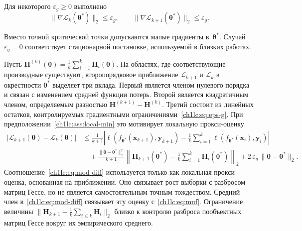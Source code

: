 \begin{assumption}\label{ch1lc:ass:local-min}
Для некоторого $\varepsilon_g\ge 0$ выполнено
\begin{equation}\label{ch1lc:eq:eps-g}
  \bigl\|\nabla \mathcal{L}_k(\boldsymbol{\theta}^*)\bigr\|_2 \le \varepsilon_g,
  \qquad
  \bigl\|\nabla \mathcal{L}_{k+1}(\boldsymbol{\theta}^*)\bigr\|_2 \le \varepsilon_g .
\end{equation}
\end{assumption}
\noindent
Вместо точной критической точки допускаются малые градиенты в~$\boldsymbol{\theta}^*$. Случай $\varepsilon_g=0$ соответствует стационарной постановке, используемой в близких работах.

Пусть $\mathbf{H}^{(k)}(\boldsymbol{\theta})=\frac{1}{k}\sum_{i=1}^{k}\mathbf{H}_i(\boldsymbol{\theta})$.
На областях, где соответствующие производные существуют, второпорядковое приближение $\mathcal{L}_{k+1}$ и $\mathcal{L}_k$ в окрестности $\boldsymbol{\theta}^*$ выделяет три вклада. Первый является членом нулевого порядка и связан с изменением средней функции потерь. Второй является квадратичным членом, определяемым разностью $\mathbf{H}^{(k+1)}-\mathbf{H}^{(k)}$. Третий состоит из линейных остатков, контролируемых градиентными ограничениями~\eqref{ch1lc:eq:eps-g}.
При предположении~\ref{ch1lc:ass:local-min} это мотивирует локальную прокси-оценку
\begin{equation}\label{ch1lc:eq:mod-diff}
\begin{split}
  \bigl|\mathcal{L}_{k+1}(\boldsymbol{\theta}) - \mathcal{L}_k(\boldsymbol{\theta})\bigr|
  &\le \frac{1}{k+1}
  \left|
    \ell(f_{\boldsymbol{\theta}^*}(\mathbf{x}_{k+1}),\mathbf{y}_{k+1})
    - \frac{1}{k}\sum_{i=1}^{k}\ell(f_{\boldsymbol{\theta}^*}(\mathbf{x}_{i}),\mathbf{y}_{i})
  \right|
  \\
  &\quad + \frac{\|\boldsymbol{\theta}-\boldsymbol{\theta}^*\|_2^2}{k+1}
  \left\| \mathbf{H}_{k+1}(\boldsymbol{\theta}^*) - \frac{1}{k}\sum_{i=1}^{k}\mathbf{H}_{i}(\boldsymbol{\theta}^*) \right\|_2
  + 2\,\varepsilon_g\,\|\boldsymbol{\theta}-\boldsymbol{\theta}^*\|_2 .
\end{split}
\end{equation}
Соотношение~\eqref{ch1lc:eq:mod-diff} используется только как локальная прокси-оценка, основанная на приближении. Оно связывает рост выборки с разбросом матриц Гессе, но не является самостоятельным точным тождеством.
Средний член в~\eqref{ch1lc:eq:mod-diff} связывает эту оценку с~\eqref{ch1lc:eq:muf}. Ограничение величины $\|\mathbf{H}_{k+1}-\frac{1}{k}\sum_{i\le k}\mathbf{H}_i\|_2$ близко к контролю разброса пообъектных матриц Гессе вокруг их эмпирического среднего.

